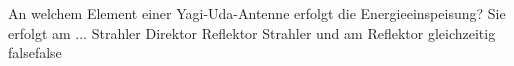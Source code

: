     {An welchem Element einer Yagi-Uda-Antenne erfolgt die Energieeinspeisung? Sie erfolgt am ...}
    {Strahler}
    {Direktor}
    {Reflektor}
    {Strahler und am Reflektor gleichzeitig}
    {false}{false}
